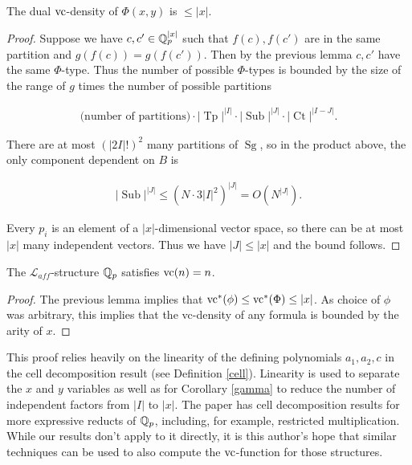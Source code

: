 \documentclass{amsart}
\renewcommand{\LL}{\mathcal L}
\newcommand{\paren}[1]{\left(#1\right)}
\DeclareMathOperator{\Sg}{Sg}
\DeclareMathOperator{\It}{Tp}
\DeclareMathOperator{\Sub}{Sub}
\DeclareMathOperator{\Ct}{Ct}
\begin{document}
\begin{Corollary}
  The dual $\operatorname{vc}$-density of $\Phi(x,y)$ is $\leq |x|$.
\end{Corollary}

\begin{proof}
  Suppose we have $c, c' \in \mathbb{Q}_p^{|x|}$ such that $f(c), f(c')$ are in the same partition and $g(f(c)) = g(f(c'))$.
  Then by the previous lemma $c, c'$ have the same $\Phi$-type.
  Thus the number of possible $\Phi$-types is bounded by the size of the range of $g$ times the number of possible partitions
  
  \begin{align*}
    \text{(number of partitions)} \cdot |\It|^{|I|} \cdot |\Sub|^{|J|} \cdot |\Ct|^{|I-J|}.
  \end{align*}

  There are at most $\paren{|2I|!}^2$ many partitions of $\Sg$,
  so in the product above, the only component dependent on $B$ is

  \begin{align*}
    |\Sub|^{|J|} \leq (N \cdot 3{|I|}^2)^{|J|} = O(N^{|J|}).
  \end{align*}	
  
  Every $p_i$ is an element of a $|x|$-dimensional vector space, so there can be at most $|x|$ many independent vectors.
  Thus we have $|J| \leq |x|$ and the bound follows.
\end{proof}

\begin{Corollary} 
  The $\LL_{aff}$-structure $\mathbb{Q}_p$ satisfies $\operatorname{vc}(n) = n$.
\end{Corollary}

\begin{proof}
  The previous lemma implies that $\operatorname{vc}^*(\phi) \leq \operatorname{vc}^*(\Phi) \leq |x|$.
  As choice of $\phi$ was arbitrary, this implies that the vc-density of any formula is bounded by the arity of $x$.
\end{proof}

This proof relies heavily on the linearity of the defining polynomials $a_1, a_2, c$ in the cell decomposition result (see Definition \ref{cell}).
Linearity is used to separate the $x$ and $y$ variables as well as
for Corollary \ref{gamma} to reduce the number of independent factors from $|I|$ to $|x|$.
The paper \cite{reduct} has cell decomposition results for more expressive reducts of $\mathbb{Q}_p$,
including, for example, restricted multiplication.
While our results don't apply to it directly,
it is this author's hope that similar techniques can be used to also compute the $\operatorname{vc}$-function for those structures.
\end{document}
